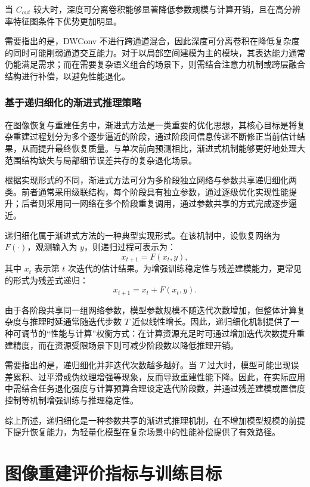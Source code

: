 当 $C_{out}$ 较大时，深度可分离卷积能够显著降低参数规模与计算开销，且在高分辨率特征图条件下优势更加明显。

需要指出的是，DWConv 不进行跨通道混合，因此深度可分离卷积在降低复杂度的同时可能削弱通道交互能力。对于以局部空间建模为主的模块，其表达能力通常仍能满足需求；而在需要复杂语义组合的场景下，则需结合注意力机制或跨层融合结构进行补偿，以避免性能退化。

\subsubsection{基于递归细化的渐进式推理策略}

在图像恢复与重建任务中，渐进式方法是一类重要的优化思想，其核心目标是将复杂重建过程划分为多个逐步逼近的阶段，通过阶段间信息传递不断修正当前估计结果，从而提升最终恢复质量。与单次前向预测相比，渐进式机制能够更好地处理大范围结构缺失与局部细节误差共存的复杂退化场景。

根据实现形式的不同，渐进式方法可分为多阶段独立网络与参数共享递归细化两类。前者通常采用级联结构，每个阶段具有独立参数，通过逐级优化实现性能提升；后者则采用同一网络在多个阶段重复调用，通过参数共享的方式完成逐步逼近。

递归细化属于渐进式方法的一种典型实现形式。在该机制中，设恢复网络为 $F(\cdot)$，观测输入为 $y$，则递归过程可表示为：
\begin{equation}
x_{t+1}=F(x_t,y),
\end{equation}
其中 $x_t$ 表示第 $t$ 次迭代的估计结果。为增强训练稳定性与残差建模能力，更常见的形式为残差式递归：
\begin{equation}
x_{t+1}=x_t+F(x_t,y).
\end{equation}

由于各阶段共享同一组网络参数，模型参数规模不随迭代次数增加，但整体计算复杂度与推理时延通常随迭代步数 $T$ 近似线性增长。因此，递归细化机制提供了一种可调节的“性能与计算”权衡方式：在计算资源充足时可通过增加迭代次数提升重建精度，而在资源受限场景下则可减少阶段数以降低推理开销。

需要指出的是，递归细化并非迭代次数越多越好。当 $T$ 过大时，模型可能出现误差累积、过平滑或伪纹理增强等现象，反而导致重建性能下降。因此，在实际应用中需结合任务退化强度与计算预算合理设定迭代阶段数，并通过残差建模或置信度控制等机制增强训练与推理稳定性。

综上所述，递归细化是一种参数共享的渐进式推理机制，在不增加模型规模的前提下提升恢复能力，为轻量化模型在复杂场景中的性能补偿提供了有效路径。
\section{图像重建评价指标与训练目标}

